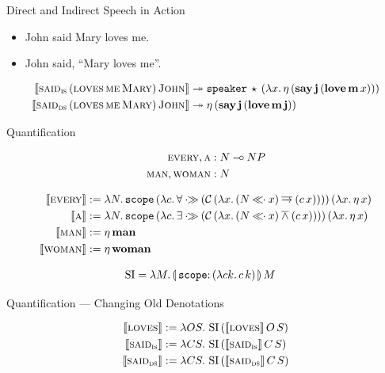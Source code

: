 \documentclass{beamer}
\begin{document}
\begin{frame}{Direct and Indirect Speech in Action}
  
\begin{itemize}
  \item John said Mary loves me.
  \item John said, ``Mary loves me''.
\end{itemize}

\vfill
\pause

\begin{align*}
  \llbracket \textsc{said}_{\textsc{is}}\,(\textsc{loves}\,\textsc{me}\,\textsc{Mary})\,\textsc{John} \rrbracket
  & \twoheadrightarrow \mathtt{speaker}\,\star\,(\lambda x.\, \eta\,(\textbf{say}\,\textbf{j}\,(\textbf{love}\,\textbf{m}\,x))) \\
  \llbracket \textsc{said}_{\textsc{ds}}\,(\textsc{loves}\,\textsc{me}\,\textsc{Mary})\,\textsc{John} \rrbracket
  & \twoheadrightarrow \eta\,(\textbf{say}\,\textbf{j}\,(\textbf{love}\,\textbf{m}\,\textbf{j}))
\end{align*}

\end{frame}


\begin{frame}{Quantification}
  
\begin{align*}
  \textsc{every}, \textsc{a} &: N \mathbin{{-}\mkern-3.5mu{\circ}} NP \\
  \textsc{man}, \textsc{woman} &: N
\end{align*}

\vfill
\pause

\begin{align*}
  \lex{every}{\lam{N}{\app{\op{scope}}{(\lam{c}{\forall \apr
          (\ap{\CC}{(\lam{x}{(N \apl x) \dimpl (\ap{c}{x})})})})}{(\lam{x}{\etaE{x}})}}} \\
  \lex{a}{\lam{N}{\app{\op{scope}}{(\lam{c}{\exists \apr
          (\ap{\CC}{(\lam{x}{(N \apl x) \dand (\ap{c}{x})})})})}{(\lam{x}{\etaE{x}})}}} \\
  \lex{man}{\etaE{\obj{man}}} \\
  \lex{woman}{\etaE{\obj{woman}}}
\end{align*}

\vfill
\pause

\begin{align*}
  \SI &= \lam{M}{\ap{\banana{\onto{\op{scope}}{(\lam{c k}{\ap{c}{k}})}}}{M}}
\end{align*}

\end{frame}


\begin{frame}{Quantification --- Changing Old Denotations }
 
\begin{align*}
  \llbracket \textsc{loves} \rrbracket &:= \lambda O S.\, \operatorname{SI}\,(\llbracket \textsc{loves} \rrbracket\,O\,S) \\
  \llbracket \textsc{said}_{\textsc{is}} \rrbracket &:= \lambda C S.\, \operatorname{SI}\,(\llbracket \textsc{said}_{\textsc{is}} \rrbracket\,C\,S) \\
  \llbracket \textsc{said}_{\textsc{ds}} \rrbracket &:= \lambda C S.\, \operatorname{SI}\,(\llbracket \textsc{said}_{\textsc{ds}} \rrbracket\,C\,S)
\end{align*}

\end{frame}
\end{document}
